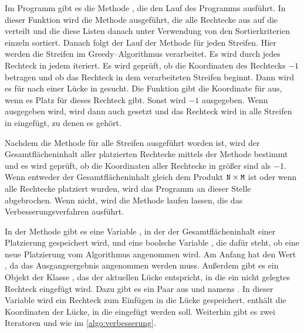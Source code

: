 Im Programm gibt es die Methode , die den Lauf des Programms ausführt.
In dieser Funktion wird die Methode  ausgeführt, die alle
Rechtecke aus  auf die 
 verteilt und die diese Listen danach unter Verwendung
von den Sortierkriterien  einzeln sortiert.
Danach folgt der Lauf der Methode  für jeden Streifen.
Hier werden die Streifen im Greedy--Algorithmus verarbeitet.
Es wird durch jedes Rechteck  in jedem   iteriert.
Es wird geprüft, ob die Koordinaten des Rechtecks  $-1$ betragen und ob das Rechteck
in dem verarbeiteten Streifen beginnt.
Dann wird es für  nach einer Lücke in  gesucht.
Die Funktion  gibt die Koordinate  für  aus,
wenn es Platz für dieses Rechteck gibt. Sonst wird $-1$ ausgegeben.
Wenn  ausgegeben wird, wird dann auch  gesetzt und 
das Rechteck  wird in alle Streifen in  eingefügt, 
zu denen es gehört.

Nachdem die Methode  für alle Streifen ausgeführt worden ist,
wird der Gesamtflächeninhalt aller platzierten Rechtecke mittels der Methode 
 bestimmt und es wird geprüft, ob 
die Koordinaten aller Rechtecke in  größer sind als $-1$.
Wenn entweder der Gesamtflächeninhalt gleich dem Produkt $\texttt{N} \times \texttt{M}$ ist
oder wenn alle Rechtecke platziert wurden, wird das Programm an dieser Stelle abgebrochen.
Wenn nicht, wird die Methode  laufen lassen, die
das Verbesserungsverfahren ausführt.


In der Methode  gibt es eine Variable ,
in der der Gesamtflächeninhalt einer Platzierung gespeichert wird, und 
eine boolsche Variable , die dafür steht,
ob eine neue Platzierung vom Algorithmus angenommen wird.
Am Anfang hat  den Wert , da das Ausgangsergebnis
angenommen werden muss.
Außerdem gibt es ein Objekt  der Klasse , das 
der aktuellen Lücke entspricht, in die ein nicht gelegtes Rechteck eingefügt wird.
Dazu gibt es ein Paar aus  und  namens .
In dieser Variable wird ein Rechteck zum Einfügen in die Lücke  gespeichert.
 enthält die Koordinaten der Lücke, in die  eingefügt
werden soll.
Weiterhin gibt es zwei Iteratoren  und  wie im \cref{algo:verbesserung}.


